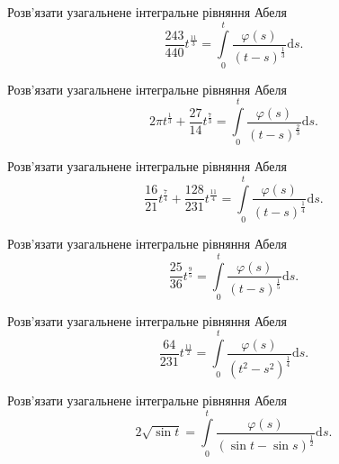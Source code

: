 \documentclass[12pt]{extarticle}
\begin{document}
\begin{Exercise}
Розв’язати узагальнене інтегральне рівняння Абеля \[\dfrac{243}{440} t^{\frac{11}{3}} = \int\limits_{0}^{t} \dfrac{\varphi(s)}{(t-s)^{\frac{1}{3}}} \mathrm{d}s.\]
\end{Exercise}

\begin{Exercise}
Розв’язати узагальнене інтегральне рівняння Абеля \[2\pi t^{\frac{1}{3}} + \dfrac{27}{14} t^{\frac{7}{3}} = \int\limits_{0}^{t} \dfrac{\varphi(s)}{(t-s)^{\frac{2}{3}}} \mathrm{d}s.\]
\end{Exercise}

\begin{Exercise}
Розв’язати узагальнене інтегральне рівняння Абеля \[\dfrac{16}{21} t^{\frac{7}{4}} + \dfrac{128}{231} t^{\frac{11}{4}} = \int\limits_{0}^{t} \dfrac{\varphi(s)}{(t-s)^{\frac{1}{4}}} \mathrm{d}s.\]
\end{Exercise}

\begin{Exercise}
Розв’язати узагальнене інтегральне рівняння Абеля \[\dfrac{25}{36} t^{\frac{9}{5}} = \int\limits_{0}^{t} \dfrac{\varphi(s)}{(t-s)^{\frac{1}{5}}} \mathrm{d}s.\]
\end{Exercise}

\begin{Exercise}
Розв’язати узагальнене інтегральне рівняння Абеля \[\dfrac{64}{231} t^{\frac{11}{2}} = \int\limits_{0}^{t} \dfrac{\varphi(s)}{(t^2-s^2)^{\frac{1}{4}}} \mathrm{d}s.\]
\end{Exercise}

\begin{Exercise}
Розв’язати узагальнене інтегральне рівняння Абеля \[2\sqrt{\sin t} = \int\limits_{0}^{t} \dfrac{\varphi(s)}{(\sin t - \sin s)^{\frac{1}{2}}} \mathrm{d}s.\]
\end{Exercise}
\end{document}

